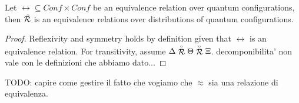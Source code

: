 
\begin{theorem}
	Let $\rel \subseteq Conf \times Conf$ be an equivalence relation over quantum configurations, then $\hat{\mathcal{R}}$ is an equivalence relations over distributions of quantum configurations.
\end{theorem}
\begin{proof}
	Reflexivity and symmetry holds by definition given that $\rel$ is an equivalence relation.
	For transitivity, assume $\Delta \stackrel{\scriptscriptstyle \circ}{\mathcal{R}} \Theta \stackrel{\scriptscriptstyle \circ}{\mathcal{R}} \Xi$.
	{\color{red} decomponibilita' non vale con le definizioni che abbiamo dato...}
\end{proof}
{\color{red} TODO: capire come gestire il fatto che vogiamo che $\approx$ sia una relazione di equivalenza.}


